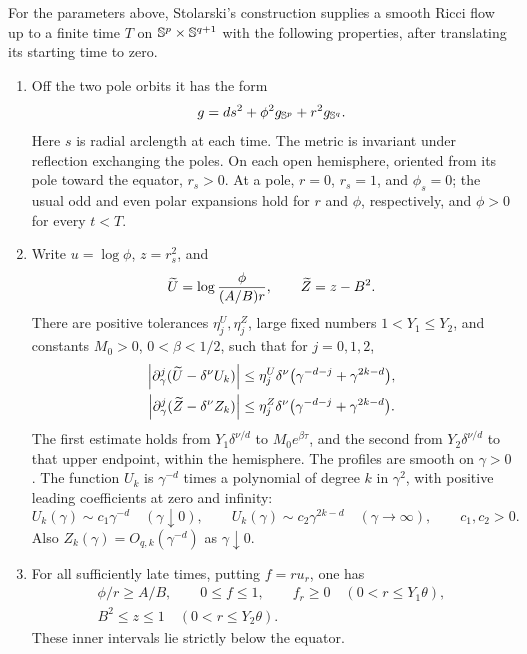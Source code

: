 \begin{proposition}\label{prop:input}
For the parameters above, Stolarski's construction supplies a smooth Ricci
flow up to a finite time \(T\) on \(\mathbb S^p\times\mathbb S^{q+1}\) with the
following properties, after translating its starting time to zero.

\begin{enumerate}[label=\textup{(\roman*)}]
\item Off the two pole orbits it has the form
\[
g=ds^2+\phi^2g_{\mathbb S^p}+r^2g_{\mathbb S^q}.
\]
Here \(s\) is radial arclength at each time. The metric is invariant under
reflection exchanging the poles. On each open hemisphere, oriented from
its pole toward the equator, \(r_s>0\). At a pole, \(r=0\), \(r_s=1\),
and \(\phi_s=0\); the usual odd and even polar expansions hold for \(r\)
and \(\phi\), respectively, and \(\phi>0\) for every \(t<T\).

\item Write \(u=\log\phi\), \(z=r_s^2\), and
\[
\widetilde U=\log\frac{\phi}{(A/B)r},\qquad \widetilde Z=z-B^2.
\]
There are positive tolerances \(\eta_j^U,\eta_j^Z\), large fixed numbers
\(1<Y_1\le Y_2\), and constants \(M_0>0\), \(0<\beta<1/2\), such that
for \(j=0,1,2\),
\begin{equation}\label{eq:profile-bounds}
\begin{aligned}
\left|\partial_\gamma^j(\widetilde U-\delta^\nu U_k)\right|
&\le\eta_j^U\delta^\nu
       \bigl(\gamma^{-d-j}+\gamma^{2k-d}\bigr),\\
\left|\partial_\gamma^j(\widetilde Z-\delta^\nu Z_k)\right|
&\le\eta_j^Z\delta^\nu
       \bigl(\gamma^{-d-j}+\gamma^{2k-d}\bigr).
\end{aligned}
\end{equation}
The first estimate holds from \(Y_1\delta^{\nu/d}\) to
\(M_0e^{\beta\tau}\), and the second from \(Y_2\delta^{\nu/d}\) to that
upper endpoint, within the hemisphere. The profiles are smooth on
\(\gamma>0\). The function \(U_k\) is \(\gamma^{-d}\) times a polynomial
of degree \(k\) in \(\gamma^2\), with positive leading coefficients at
zero and infinity:
\[
U_k(\gamma)\sim c_1\gamma^{-d}\quad(\gamma\downarrow0),\qquad
U_k(\gamma)\sim c_2\gamma^{2k-d}\quad(\gamma\to\infty),\qquad c_1,c_2>0.
\]
Also \(Z_k(\gamma)=O_{q,k}(\gamma^{-d})\) as \(\gamma\downarrow0\).

\item For all sufficiently late times, putting \(f=ru_r\), one has
\begin{equation}\label{eq:inner-inputs}
\begin{gathered}
\phi/r\ge A/B,\qquad 0\le f\le1,\qquad f_r\ge0
       \quad(0<r\le Y_1\theta),\\
B^2\le z\le1\quad(0<r\le Y_2\theta).
\end{gathered}
\end{equation}
These inner intervals lie strictly below the equator.


\end{enumerate}
\end{proposition}
